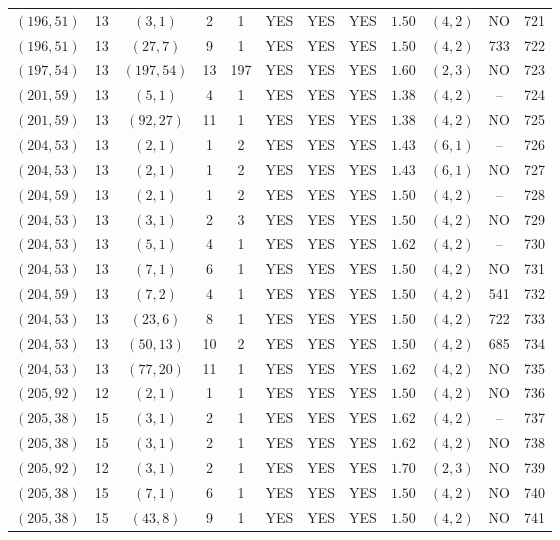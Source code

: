 \begin{longtable}{|c|c|c|c|c|c|c|c|c|c|c|c|}
$(196,51)$ & 13 & $(3,1)$ & 2 & 1 & YES & YES & YES & $1.50$ & $(4,2)$ & NO & 721\\
$(196,51)$ & 13 & $(27,7)$ & 9 & 1 & YES & YES & YES & $1.50$ & $(4,2)$ & 733 & 722\\
$(197,54)$ & 13 & $(197,54)$ & 13 & 197 & YES & YES & YES & $1.60$ & $(2,3)$ & NO & 723\\
$(201,59)$ & 13 & $(5,1)$ & 4 & 1 & YES & YES & YES & $1.38$ & $(4,2)$ & -- & 724\\
$(201,59)$ & 13 & $(92,27)$ & 11 & 1 & YES & YES & YES & $1.38$ & $(4,2)$ & NO & 725\\
$(204,53)$ & 13 & $(2,1)$ & 1 & 2 & YES & YES & YES & $1.43$ & $(6,1)$ & -- & 726\\
$(204,53)$ & 13 & $(2,1)$ & 1 & 2 & YES & YES & YES & $1.43$ & $(6,1)$ & NO & 727\\
$(204,59)$ & 13 & $(2,1)$ & 1 & 2 & YES & YES & YES & $1.50$ & $(4,2)$ & -- & 728\\
$(204,53)$ & 13 & $(3,1)$ & 2 & 3 & YES & YES & YES & $1.50$ & $(4,2)$ & NO & 729\\
$(204,53)$ & 13 & $(5,1)$ & 4 & 1 & YES & YES & YES & $1.62$ & $(4,2)$ & -- & 730\\
$(204,53)$ & 13 & $(7,1)$ & 6 & 1 & YES & YES & YES & $1.50$ & $(4,2)$ & NO & 731\\
$(204,59)$ & 13 & $(7,2)$ & 4 & 1 & YES & YES & YES & $1.50$ & $(4,2)$ & 541 & 732\\
$(204,53)$ & 13 & $(23,6)$ & 8 & 1 & YES & YES & YES & $1.50$ & $(4,2)$ & 722 & 733\\
$(204,53)$ & 13 & $(50,13)$ & 10 & 2 & YES & YES & YES & $1.50$ & $(4,2)$ & 685 & 734\\
$(204,53)$ & 13 & $(77,20)$ & 11 & 1 & YES & YES & YES & $1.62$ & $(4,2)$ & NO & 735\\
$(205,92)$ & 12 & $(2,1)$ & 1 & 1 & YES & YES & YES & $1.50$ & $(4,2)$ & NO & 736\\
$(205,38)$ & 15 & $(3,1)$ & 2 & 1 & YES & YES & YES & $1.62$ & $(4,2)$ & -- & 737\\
$(205,38)$ & 15 & $(3,1)$ & 2 & 1 & YES & YES & YES & $1.62$ & $(4,2)$ & NO & 738\\
$(205,92)$ & 12 & $(3,1)$ & 2 & 1 & YES & YES & YES & $1.70$ & $(2,3)$ & NO & 739\\
$(205,38)$ & 15 & $(7,1)$ & 6 & 1 & YES & YES & YES & $1.50$ & $(4,2)$ & NO & 740\\
$(205,38)$ & 15 & $(43,8)$ & 9 & 1 & YES & YES & YES & $1.50$ & $(4,2)$ & NO & 741\\

\end{longtable}
